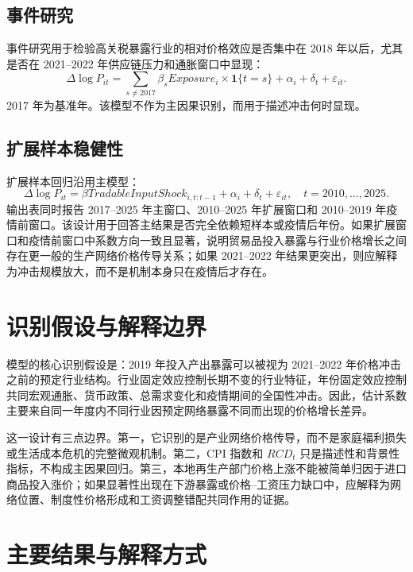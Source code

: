 \documentclass[12pt,a4paper,fontset=none]{ctexart}
\begin{document}
\subsection{事件研究}

事件研究用于检验高关税暴露行业的相对价格效应是否集中在 2018 年以后，尤其是否在 2021--2022 年供应链压力和通胀窗口中显现：
\begin{equation}
\Delta \log P_{it}
=\sum_{s\neq 2017}\beta_s Exposure_i\times \mathbf{1}\{t=s\}
+\alpha_i+\delta_t+\varepsilon_{it}.
\end{equation}
2017 年为基准年。该模型不作为主因果识别，而用于描述冲击何时显现。

\subsection{扩展样本稳健性}

扩展样本回归沿用主模型：
\begin{equation}
\Delta \log P_{it}
=\beta TradableInputShock_{i,t:t-1}
+\alpha_i+\delta_t+\varepsilon_{it},
\quad t=2010,\ldots,2025.
\end{equation}
输出表同时报告 2017--2025 年主窗口、2010--2025 年扩展窗口和 2010--2019 年疫情前窗口。该设计用于回答主结果是否完全依赖短样本或疫情后年份。如果扩展窗口和疫情前窗口中系数方向一致且显著，说明贸易品投入暴露与行业价格增长之间存在更一般的生产网络价格传导关系；如果 2021--2022 年结果更突出，则应解释为冲击规模放大，而不是机制本身只在疫情后才存在。

\section{识别假设与解释边界}

模型的核心识别假设是：2019 年投入产出暴露可以被视为 2021--2022 年价格冲击之前的预定行业结构。行业固定效应控制长期不变的行业特征，年份固定效应控制共同宏观通胀、货币政策、总需求变化和疫情期间的全国性冲击。因此，估计系数主要来自同一年度内不同行业因预定网络暴露不同而出现的价格增长差异。

这一设计有三点边界。第一，它识别的是产业网络价格传导，而不是家庭福利损失或生活成本危机的完整微观机制。第二，CPI 指数和 \(RCD_t\) 只是描述性和背景性指标，不构成主因果回归。第三，本地再生产部门价格上涨不能被简单归因于进口商品投入涨价；如果显著性出现在下游暴露或价格--工资压力缺口中，应解释为网络位置、制度性价格形成和工资调整错配共同作用的证据。

\section{主要结果与解释方式}
\end{document}
